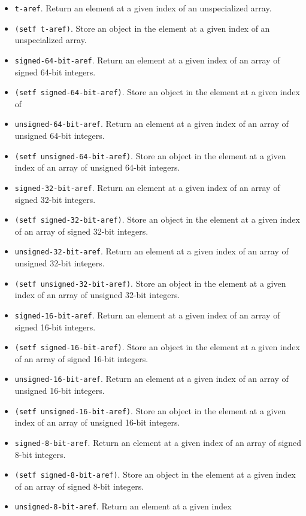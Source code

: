 \begin{itemize}
\item \texttt{t-aref}.  Return an element at a given index of an
  unspecialized array.
\item \texttt{(setf t-aref)}.  Store an object in the element at a
  given index of an unspecialized array.
\item \texttt{signed-64-bit-aref}.  Return an element at a given index
  of an array of signed 64-bit integers.
\item \texttt{(setf signed-64-bit-aref)}.  Store an object in the
  element at a given index of
\item \texttt{unsigned-64-bit-aref}.  Return an element at a given
  index of an array of unsigned 64-bit integers.
\item \texttt{(setf unsigned-64-bit-aref)}.  Store an object in the
  element at a given index of an array of unsigned 64-bit integers.
\item \texttt{signed-32-bit-aref}.  Return an element at a given index
  of an array of signed 32-bit integers. 
\item \texttt{(setf signed-32-bit-aref)}.  Store an object in the
  element at a given index of an array of signed 32-bit integers.
\item \texttt{unsigned-32-bit-aref}.  Return an element at a given
  index of an array of unsigned 32-bit integers. 
\item \texttt{(setf unsigned-32-bit-aref)}.  Store an object in the
  element at a given index of an array of unsigned 32-bit integers.
\item \texttt{signed-16-bit-aref}.  Return an element at a given index
  of an array of signed 16-bit integers. 
\item \texttt{(setf signed-16-bit-aref)}.  Store an object in the
  element at a given index of an array of signed 16-bit integers.
\item \texttt{unsigned-16-bit-aref}.  Return an element at a given
  index of an array of unsigned 16-bit integers. 
\item \texttt{(setf unsigned-16-bit-aref)}.  Store an object in the
  element at a given index of an array of unsigned 16-bit integers.
\item \texttt{signed-8-bit-aref}.  Return an element at a given index
  of an array of signed 8-bit integers.
\item \texttt{(setf signed-8-bit-aref)}.  Store an object in the
  element at a given index of an array of signed 8-bit integers.
\item \texttt{unsigned-8-bit-aref}.  Return an element at a given index

\end{itemize}
